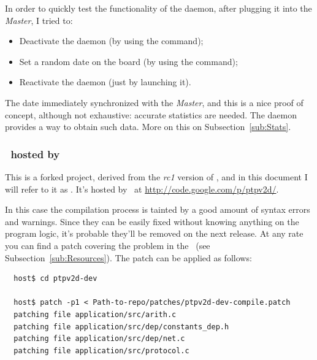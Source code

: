         In order to quickly test the functionality of the daemon, after
        plugging it into the \emph{Master}, I tried to:
        \begin{itemize}
        \item   Deactivate the daemon (by using the 
                command);
        \item   Set a random date on the board (by using the 
                command);
        \item   Reactivate the daemon (just by launching it).
        \end{itemize}
        The date immediately synchronized with the \emph{Master}, and this
        is a nice proof of concept, although not exhaustive: accurate
        statistics are needed.
        The daemon provides a way to obtain such data. More on this on
        Subsection~\ref{sub:Stats}.


    \subsubsection{ \PTPd\ hosted by \GoogleCode } \label{subsub:PTPdV2}

        This is a forked project, derived from the \emph{rc1} version of
        \PTPd, and in this document I will refer to it as \PTPdGC. It's
        hosted by \GoogleCode\ at \url{http://code.google.com/p/ptpv2d/}.

        In this case the compilation process is tainted by a good amount
        of syntax errors and warnings. Since they can be easily fixed
        without knowing anything on the program logic, it's probable
        they'll be removed on the next release. At any rate you can find a
        patch covering the problem in the \MyRepo\ (see
        Subsection~\ref{sub:Resources}). The patch can be applied as
        follows:
\begin{lstlisting}
  host$ cd ptpv2d-dev

  host$ patch -p1 < Path-to-repo/patches/ptpv2d-dev-compile.patch
  patching file application/src/arith.c
  patching file application/src/dep/constants_dep.h
  patching file application/src/dep/net.c
  patching file application/src/protocol.c
\end{lstlisting}

